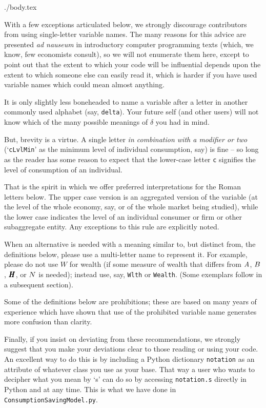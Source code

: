 \documentclass{econtex}
\begin{document}
\begin{verbatimwrite}{./body.tex}

With a few exceptions articulated below, we strongly discourage contributors from using single-letter variable names.  The many reasons for this advice are presented {\it ad nauseum} in introductory computer programming texts (which, we know, few economists consult), so we will not enumerate them here, except to point out that the extent to which your code will be influential depends upon the extent to which someone else can easily read it, which is harder if you have used variable names which could mean almost anything.

It is only slightly less boneheaded to name a variable after a letter in another commonly used alphabet (say, \texttt{delta}).  Your future self (and other users) will not know which of the many possible meanings of $\delta$ you had in mind.

But, brevity is a virtue.  A single letter {\it in combination with a modifier or two} (`\texttt{cLvlMin}' as the minimum level of individual consumption, say) is fine -- so long as the reader has some reason to expect that the lower-case letter \texttt{c} signifies the level of consumption of an individual.  

That is the spirit in which we offer preferred interpretations for the Roman letters below.  The upper case version is an aggregated version of the variable (at the level of the whole economy, say, or of the whole market being studied), while the lower case indicates the level of an individual consumer or firm or other subaggregate entity.  Any exceptions to this rule are explicitly noted.

When an alternative is needed with a meaning similar to, but distinct from, the definitions below, please use a multi-letter name to represent it.  For example, please do not use $W$ for wealth (if some measure of wealth that differs from $A$, $B$, $\pmb{H}$, or $N$ is needed); instead use, say, \texttt{Wlth} or \texttt{Wealth}.  (Some exemplars follow in a subsequent section).

Some of the definitions below are prohibitions; these are based on many years of experience which have shown that use of the prohibited variable name generates more confusion than clarity.  

Finally, if you insist on deviating from these recommendations, we strongly suggest that you make your deviations clear to those reading or using your code.  An excellent way to do this is by including a Python dictionary \texttt{notation} as an attribute of whatever class you use as your base.  That way a user who wants to decipher what you mean by `s' can do so by accessing \texttt{notation.s} directly in Python and at any time.  This is what we have done in \texttt{ConsumptionSavingModel.py}.


\end{verbatimwrite}
\end{document}
